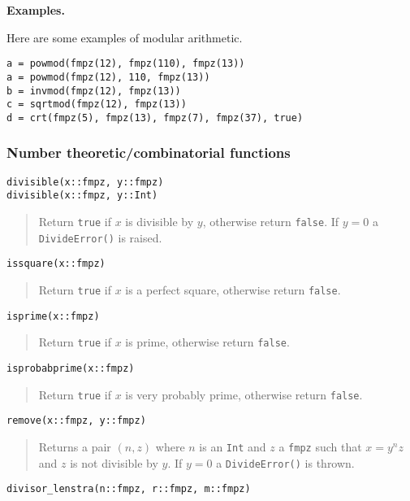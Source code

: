 \documentclass[a4paper,10pt]{article}
\newcommand{\code}{\lstinline}
\newcommand{\desc}[1]{\vspace{-3mm}\begin{quote}#1\end{quote}}
\begin{document}
{{\textbf{Examples.}

Here are some examples of modular arithmetic.

\begin{lstlisting}
a = powmod(fmpz(12), fmpz(110), fmpz(13))
a = powmod(fmpz(12), 110, fmpz(13))
b = invmod(fmpz(12), fmpz(13))
c = sqrtmod(fmpz(12), fmpz(13))
d = crt(fmpz(5), fmpz(13), fmpz(7), fmpz(37), true)
\end{lstlisting}

\subsubsection{Number theoretic/combinatorial functions}

\begin{lstlisting}
divisible(x::fmpz, y::fmpz)
divisible(x::fmpz, y::Int)
\end{lstlisting}

\desc{Return \code{true} if $x$ is divisible by $y$, otherwise return \code{false}. If
$y = 0$ a \code{DivideError()} is raised.}

\begin{lstlisting}
issquare(x::fmpz)
\end{lstlisting}

\desc{Return \code{true} if $x$ is a perfect square, otherwise return \code{false}.}

\begin{lstlisting}
isprime(x::fmpz)
\end{lstlisting}

\desc{Return \code{true} if $x$ is prime, otherwise return \code{false}.}

\begin{lstlisting}
isprobabprime(x::fmpz)
\end{lstlisting}

\desc{Return \code{true} if $x$ is very probably prime, otherwise return \code{false}.}

\begin{lstlisting}
remove(x::fmpz, y::fmpz)
\end{lstlisting}

\desc{Returns a pair $(n, z)$ where $n$ is an \code{Int} and $z$ a \code{fmpz} such that
$x = y^nz$ and $z$ is not divisible by $y$. If $y = 0$ a \code{DivideError()} is thrown.}

\begin{lstlisting}
divisor_lenstra(n::fmpz, r::fmpz, m::fmpz)
\end{lstlisting}

}}
\end{document}

